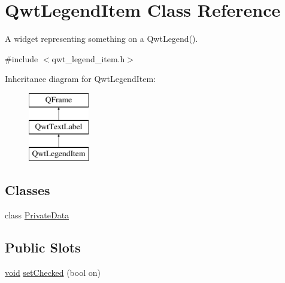 \hypertarget{class_qwt_legend_item}{\section{Qwt\-Legend\-Item Class Reference}
\label{class_qwt_legend_item}
}


A widget representing something on a Qwt\-Legend().  




{\ttfamily \#include $<$qwt\-\_\-legend\-\_\-item.\-h$>$}

Inheritance diagram for Qwt\-Legend\-Item\-:\begin{figure}[H]
\begin{center}
\leavevmode
\includegraphics[height=3.000000cm]{class_qwt_legend_item}
\end{center}
\end{figure}
\subsection*{Classes}
\begin{DoxyCompactItemize}
\item 
class \hyperlink{class_qwt_legend_item_1_1_private_data}{Private\-Data}
\end{DoxyCompactItemize}
\subsection*{Public Slots}
\begin{DoxyCompactItemize}
\item 
\hyperlink{group___u_a_v_objects_plugin_ga444cf2ff3f0ecbe028adce838d373f5c}{void} \hyperlink{class_qwt_legend_item_af7a194ea464d2c405479dd8be1bd1e1b}{set\-Checked} (bool on)
\end{DoxyCompactItemize}
